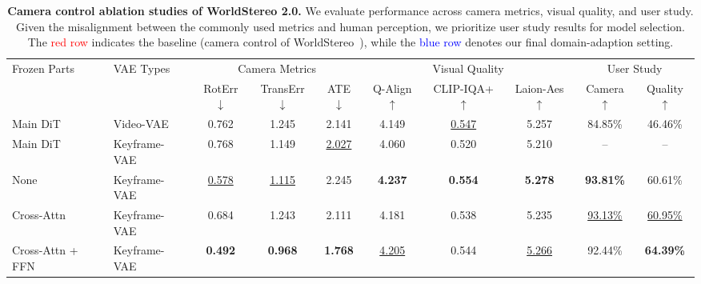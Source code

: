 \documentclass{article} %
\begin{document}
\begin{table}
\centering
\vspace{-0.15in}
\caption{\textbf{Camera control ablation studies of WorldStereo 2.0.} We evaluate performance across camera metrics, visual quality, and user study. Given the misalignment between the commonly used metrics and human perception, we prioritize user study results for model selection. 
The \textcolor{red}{red row} indicates the baseline (camera control of WorldStereo~\cite{worldstereo2026}), while the \textcolor{blue}{blue row} denotes our final domain-adaption setting.
\label{tab:camera_control_ablation}}
\fontsize{8.0}{9}\selectfont
\setlength{\tabcolsep}{2.2pt}
\begin{tabular}{ll ccc ccc cc}
\toprule
\multirow{2}{*}{Frozen Parts} & \multirow{2}{*}{VAE Types} &
\multicolumn{3}{c}{Camera Metrics} &
\multicolumn{3}{c}{Visual Quality} &
\multicolumn{2}{c}{User Study} \\
\cmidrule(lr){3-5}\cmidrule(lr){6-8}\cmidrule(lr){9-10}
 &  &
RotErr$\downarrow$ & TransErr$\downarrow$ & ATE$\downarrow$ &
Q-Align$\uparrow$ & CLIP-IQA+$\uparrow$ & Laion-Aes$\uparrow$ &
Camera$\uparrow$ & Quality$\uparrow$ \\
\midrule
\rowcolor{red!10}
Main DiT & Video-VAE
& 0.762 & 1.245 & 2.141
& 4.149 & \underline{0.547} & 5.257
& 84.85\% & 46.46\% \\
Main DiT & Keyframe-VAE
& 0.768 & 1.149 & \underline{2.027}
& 4.060 & 0.520 & 5.210
& -- & -- \\
None & Keyframe-VAE
& \underline{0.578} & \underline{1.115} & 2.245
& \textbf{4.237} & \textbf{0.554} & \textbf{5.278}
& \textbf{93.81\%} & 60.61\% \\
Cross-Attn & Keyframe-VAE
& 0.684 & 1.243 & 2.111
& 4.181 & 0.538 & 5.235
& \underline{93.13\%} & \underline{60.95\%} \\
\rowcolor{blue!10}
Cross-Attn + FFN & Keyframe-VAE
& \textbf{0.492} & \textbf{0.968} & \textbf{1.768}
& \underline{4.205} & 0.544 & \underline{5.266} & 92.44\% & \textbf{64.39\%} \\
\bottomrule
\end{tabular}
\end{table}
\end{document}
